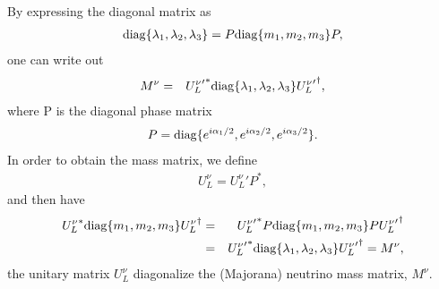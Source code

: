 \documentclass[11pt]{article}
\begin{document}
\section{ }
By expressing the diagonal matrix as
 \begin{eqnarray}
  {\rm diag}\{ \lambda_1, \lambda_2, \lambda_3 \}
  = P {\rm diag}\{ m_1,        m_2,        m_3        \} P,
 \end{eqnarray}
 one can write out 
 \begin{eqnarray}
    M^\nu &=& {{U^\nu_L}'}^*  {\rm diag}\{\lambda_1, \lambda_2, \lambda_3\}  {{U^\nu_L}'}^\dagger,
\end{eqnarray}
  where P is the diagonal phase matrix
\begin{eqnarray}
    P =  {\rm diag}\{ e^{i\alpha_1/2}, e^{i\alpha_2/2}, e^{i\alpha_3/2}\}.
\end{eqnarray}
In order to obtain the mass matrix, we define
\begin{eqnarray}
    U^\nu_L = {U^\nu_L}' P^*, 
\end{eqnarray}
and then have 
\begin{eqnarray}
    {U^\nu_L}^*     {\rm diag}\{m_1, m_2, m_3\}  {U^\nu_L}^\dagger &=& {{U^\nu_L}'}^* P {\rm diag}\{m_1, m_2, m_3\} P {{U^\nu_L}'}^\dagger \\
    &=& {{U^\nu_L}'}^*  {\rm diag}\{\lambda_1, \lambda_2, \lambda_3\}  {{U^\nu_L}'}^\dagger =  M^\nu, 
\end{eqnarray}
the unitary matrix $U^\nu_L$ diagonalize the (Majorana) neutrino mass matrix, $M^\nu$.
\end{document}
